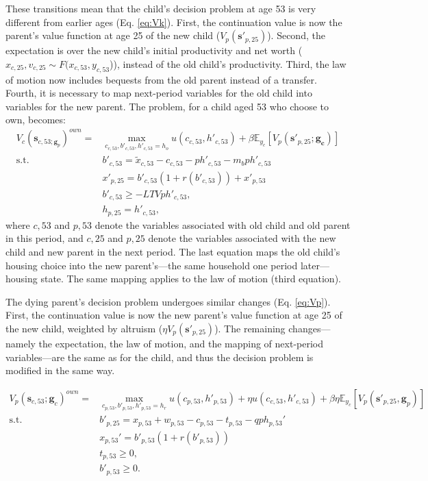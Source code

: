 \documentclass[12pt]{article}
\newcommand{\E}{\mathbb{E}}
\begin{document}
These transitions mean that the child's decision problem at age 53 is very different from earlier ages (Eq. \ref{eq:Vk}). First, the continuation value is now the parent's value function at age 25 of the new child ($V_{p}({\mathbf{s}'_{p,25}})$). Second, the expectation is over the new child's initial productivity and net worth ($x_{c,25},v_{c,25}\sim F(x_{c,53},y_{c,53}$)), instead of the old child's productivity. Third, the law of motion now includes bequests from the old parent instead of a transfer. Fourth, it is necessary to map next-period variables for the old child into variables for the new parent. The problem, for a child aged 53 who choose to own, becomes:
\begin{equation*}
\begin{split}
V_c(\mathbf{s}_{c,53;\mathbf{g}_p})^{own} = &\max_{c_{c,53},b'_{c,53},h'_{c,53}=h_o} u(c_{c,53},h'_{c,53}) + \beta \E_{y_c}\left[V_{p}({\mathbf{s}'_{p,25}};\mathbf{g_c}) \right] \\
\text{s.t.}\quad & 	b'_{c,53} = \tilde x_{c,53} - c_{c,53} - p h'_{c,53}  - m_b p h'_{c,53} \\
& x'_{p,25} = b'_{c,53}(1+r(b'_{c,53})) + x'_{p,53} \\
& b'_{c,53} \ge -LTV p h'_{c,53}, \\
& h_{p,25} = h'_{c,53},
\end{split}
\end{equation*} 
where $c,53$ and $p,53$ denote the variables associated with old child and old parent in this period, and $c,25$ and $p,25$ denote the variables associated with the new child and new parent in the next period. The last equation maps the old child's housing choice into the new parent's---the same household one period later---housing state. The same mapping applies to the law of motion (third equation).

The dying parent's decision problem undergoes similar changes (Eq. \ref{eq:Vp}). First, the continuation value is now the new parent's value function at age 25 of the new child, weighted by altruism ($\eta V_p(\mathbf{s}'_{p,25})$). The remaining changes---namely the expectation, the law of motion, and the mapping of next-period variables---are the same as for the child, and thus the decision problem is modified in the same way.

\begin{equation*}
	\begin{split}
	V_p(\mathbf{s}_{c,53};\mathbf{g}_c)^{own} = &\max_{c_{p,53},b'_{p,53},h'_{p,53}=h_r} u(c_{p,53},h'_{p,53}) + \eta u(c_{c,53},h'_{c,53}) + \beta \eta \E_{y_c}\left[V_{p}({\mathbf{s}'_{p,25}},\mathbf{g}_p) \right] \\
	\text{s.t.}\quad & b'_{p,25} = x_{p,53} + w_{p,53} - c_{p,53} - t_{p,53} - q p h_{p,53}'\\
	& x_{p,53}' = b'_{p,53}(1+r(b'_{p,53})) \\
	& t_{p,53}\ge0, \\
	& b'_{p,53}\ge 0. \\
	\end{split}
\end{equation*} 
\end{document}
